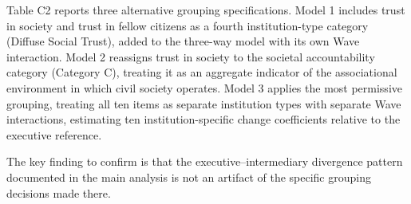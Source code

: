 \documentclass[
  12pt,
  letterpaper]{article}
\begin{document}
Table C2 reports three alternative grouping specifications. Model 1
includes trust in society and trust in fellow citizens as a fourth
institution-type category (Diffuse Social Trust), added to the three-way
model with its own Wave interaction. Model 2 reassigns trust in society
to the societal accountability category (Category C), treating it as an
aggregate indicator of the associational environment in which civil
society operates. Model 3 applies the most permissive grouping, treating
all ten items as separate institution types with separate Wave
interactions, estimating ten institution-specific change coefficients
relative to the executive reference.

The key finding to confirm is that the executive--intermediary
divergence pattern documented in the main analysis is not an artifact of
the specific grouping decisions made there.
\end{document}
